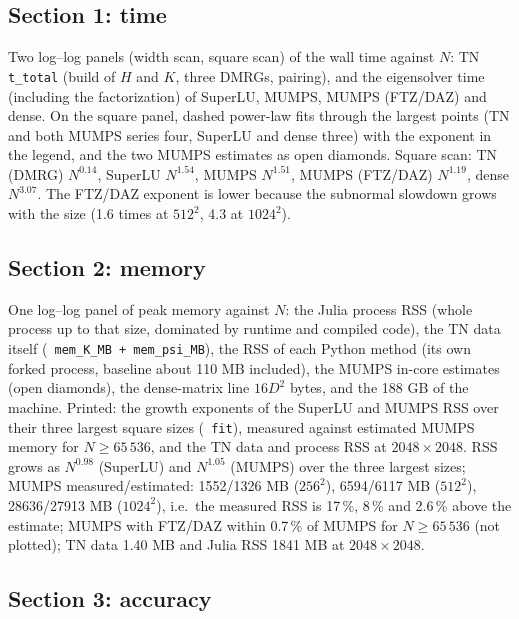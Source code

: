 \documentclass[11pt]{article}
\renewcommand{\code}[1]{\texttt{\hyphenchar\font=-1 #1}}
\begin{document}
\subsection{Section 1: time}

Two log--log panels (width scan, square scan) of the wall time against $N$: TN \code{t\_total} (build of $H$ and $K$, three DMRGs, pairing),
and the eigensolver time (including the factorization) of SuperLU, MUMPS, MUMPS (FTZ/DAZ) and dense. On the square panel, dashed power-law
fits through the largest points (TN and both MUMPS series four, SuperLU and dense three) with the exponent in the legend, and the two MUMPS
estimates as open diamonds. Square scan: TN (DMRG) $N^{0.14}$, SuperLU $N^{1.54}$, MUMPS $N^{1.51}$, MUMPS (FTZ/DAZ) $N^{1.19}$, dense $N^{3.07}$.
The FTZ/DAZ exponent is lower because the subnormal slowdown grows with the size (1.6 times at $512^2$, 4.3 at $1024^2$).

\subsection{Section 2: memory}

One log--log panel of peak memory against $N$: the Julia process RSS (whole process up to that size, dominated by runtime and compiled code), the
TN data itself (\code{mem\_K\_MB + mem\_psi\_MB}), the RSS of each Python method (its own forked process, baseline about 110 MB included), the
MUMPS in-core estimates (open diamonds), the dense-matrix line $16D^2$ bytes, and the 188 GB of the machine. Printed: the growth exponents of the
SuperLU and MUMPS RSS over their three largest square sizes (\code{fit}), measured against estimated MUMPS memory for $N\ge65\,536$, and the TN
data and process RSS at $2048\times2048$. RSS grows as $N^{0.98}$ (SuperLU) and $N^{1.05}$ (MUMPS) over the three largest sizes; MUMPS measured/estimated: 1552/1326 MB ($256^2$), 6594/6117 MB ($512^2$), 28636/27913 MB ($1024^2$), i.e.\ the measured RSS is 17\,\%, 8\,\% and 2.6\,\% above the estimate; MUMPS with FTZ/DAZ within 0.7\,\% of MUMPS for $N\ge65\,536$ (not plotted); TN data 1.40 MB and Julia RSS 1841 MB at $2048\times2048$.

\subsection{Section 3: accuracy}
\end{document}
